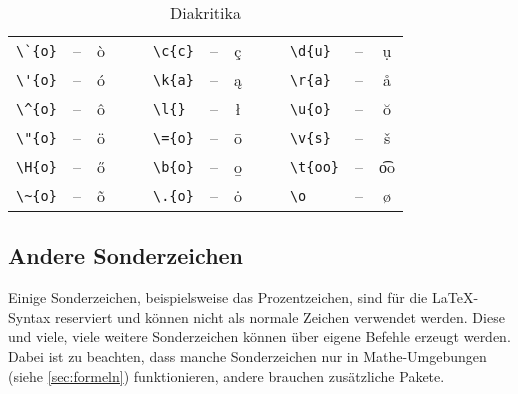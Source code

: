 \begin{table}[H]
	\center
	\begin{tabular}{lccclccclcc}
		\toprule
			\verb|\`{o}| & -- & \`{o} & $\quad$ & \verb|\c{c}| & -- & \c{c} & $\quad$ & \verb|\d{u}| & -- & \d{u} \\
			\verb|\'{o}| & -- & \'{o} & & \verb|\k{a}| & -- & \k{a} & & \verb|\r{a}| & -- & \r{a} \\
			\verb|\^{o}| & -- & \^{o} & & \verb|\l{}| & -- & \l{} & & \verb|\u{o}| & -- & \u{o} \\
			\verb|\"{o}| & -- & \"{o} & & \verb|\={o}| & -- & \={o} & & \verb|\v{s}| & -- & \v{s} \\
			\verb|\H{o}| & -- & \H{o} & & \verb|\b{o}| & -- & \b{o} & & \verb|\t{oo}| & -- & \t{oo} \\
			\verb|\~{o}| & -- & \~{o} & & \verb|\.{o}| & -- & \.{o} & & \verb|\o| & -- & \o \\
		\bottomrule
	\end{tabular}
	\caption{Diakritika}
	\label{tbl:diakritika}
\end{table}

\subsection{Andere Sonderzeichen}
Einige Sonderzeichen, beispielsweise das Prozentzeichen, sind für die \LaTeX{}-Syntax reserviert und können nicht als normale Zeichen verwendet werden.
Diese und viele, viele weitere Sonderzeichen können über eigene Befehle erzeugt werden.
Dabei ist zu beachten, dass manche Sonderzeichen nur in Mathe-Umgebungen (siehe \cref{sec:formeln}) funktionieren, andere brauchen zusätzliche Pakete.

